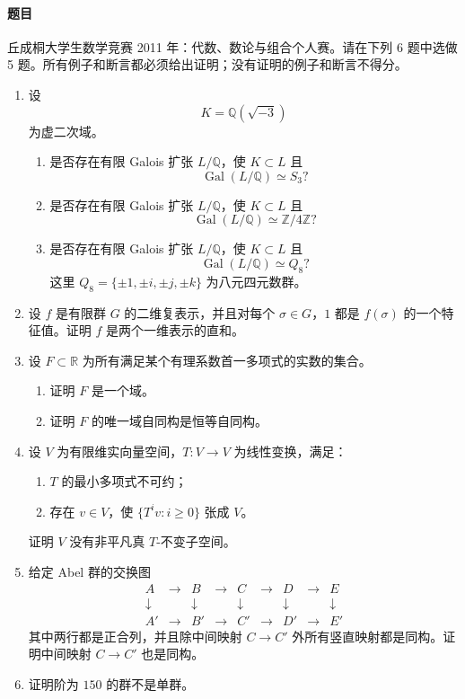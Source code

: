 \documentclass[UTF8,12pt]{ctexart}
\begin{document}
\paragraph{题目}
丘成桐大学生数学竞赛 2011 年：代数、数论与组合个人赛。请在下列 6 题中选做 5 题。所有例子和断言都必须给出证明；没有证明的例子和断言不得分。
\begin{enumerate}[label=\textbf{\arabic*.},leftmargin=2.2em]
\item 设
\[
K=\mathbb Q(\sqrt{-3})
\]
为虚二次域。
\begin{enumerate}[label=\textbf{(\alph*)},leftmargin=2.4em]
\item 是否存在有限 Galois 扩张 \(L/\mathbb Q\)，使 \(K\subset L\) 且
\[
\operatorname{Gal}(L/\mathbb Q)\simeq S_3?
\]
\item 是否存在有限 Galois 扩张 \(L/\mathbb Q\)，使 \(K\subset L\) 且
\[
\operatorname{Gal}(L/\mathbb Q)\simeq \mathbb Z/4\mathbb Z?
\]
\item 是否存在有限 Galois 扩张 \(L/\mathbb Q\)，使 \(K\subset L\) 且
\[
\operatorname{Gal}(L/\mathbb Q)\simeq Q_8?
\]
这里 \(Q_8=\{\pm1,\pm i,\pm j,\pm k\}\) 为八元四元数群。
\end{enumerate}

\item 设 \(f\) 是有限群 \(G\) 的二维复表示，并且对每个 \(\sigma\in G\)，\(1\) 都是 \(f(\sigma)\) 的一个特征值。证明 \(f\) 是两个一维表示的直和。

\item 设 \(F\subset\mathbb R\) 为所有满足某个有理系数首一多项式的实数的集合。
\begin{enumerate}[label=\textbf{(\arabic*)},leftmargin=2.4em]
\item 证明 \(F\) 是一个域。
\item 证明 \(F\) 的唯一域自同构是恒等自同构。
\end{enumerate}

\item 设 \(V\) 为有限维实向量空间，\(T:V\to V\) 为线性变换，满足：
\begin{enumerate}[label=\textbf{(\arabic*)},leftmargin=2.4em]
\item \(T\) 的最小多项式不可约；
\item 存在 \(v\in V\)，使 \(\{T^iv:i\ge0\}\) 张成 \(V\)。
\end{enumerate}
证明 \(V\) 没有非平凡真 \(T\)-不变子空间。

\item 给定 Abel 群的交换图
\[
\begin{array}{ccccccccc}
A&\to&B&\to&C&\to&D&\to&E\\
\downarrow&&\downarrow&&\downarrow&&\downarrow&&\downarrow\\
A'&\to&B'&\to&C'&\to&D'&\to&E'
\end{array}
\]
其中两行都是正合列，并且除中间映射 \(C\to C'\) 外所有竖直映射都是同构。证明中间映射 \(C\to C'\) 也是同构。

\item 证明阶为 \(150\) 的群不是单群。
\end{enumerate}
\end{document}
